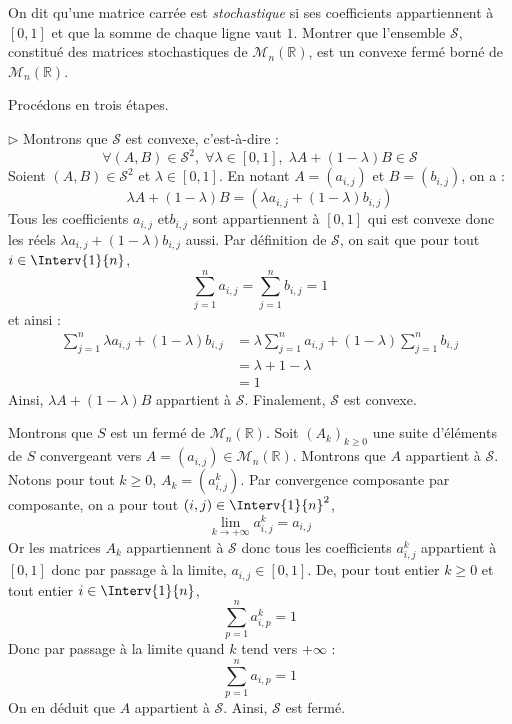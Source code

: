 \documentclass[a4paper,10pt]{report}
\begin{document}
\begin{Exercice}{} On dit qu'une matrice carrée est \textit{stochastique} si ses coefficients appartiennent à $[0,1]$ et que la somme de chaque ligne vaut $1$. Montrer que l'ensemble $\mathcal{S}$, constitué des matrices stochastiques de $\mathcal{M}_n(\mathbb{R})$, est un convexe fermé borné de $\mathcal{M}_n(\mathbb{R})$.
\end{Exercice} 

\corr Procédons en trois étapes.

\medskip

\noindent $\rhd$ Montrons que $\mathcal{S}$ est convexe, c'est-à-dire :
$$ \forall (A,B) \in \mathcal{S}^2, \; \forall \lambda \in [0,1], \; \lambda A+(1-\lambda)B \in \mathcal{S}$$
Soient $(A,B) \in \mathcal{S}^2$ et $\lambda \in [0,1]$. En notant $A=(a_{i,j})$ et $B=(b_{i,j})$, on a :
$$ \lambda A+ (1- \lambda) B = (\lambda a_{i,j} + (1- \lambda) b_{i,j})$$
Tous les coefficients $a_{i,j}$ et$ b_{i,j}$ sont appartiennent à $[0,1]$ qui est convexe donc les réels $\lambda a_{i,j} + (1- \lambda) b_{i,j}$ aussi. Par définition de $\mathcal{S}$, on sait que pour tout $i \in \Interv{1}{n}$,
$$ \sum_{j=1}^n a_{i,j} = \sum_{j=1}^n b_{i,j} = 1$$
et ainsi :
\begin{align*}
\sum_{j=1}^n \lambda a_{i,j} + (1 - \lambda) b_{i,j} & = \lambda   \sum_{j=1}^n a_{i,j} + (1 - \lambda)  \sum_{j=1}^n b_{i,j}  \\
& = \lambda + 1- \lambda \\
& = 1
\end{align*}
Ainsi, $\lambda A+ (1- \lambda)B$ appartient à $\mathcal{S}$. Finalement, $\mathcal{S}$ est convexe.

\medskip

\noindent Montrons que $S$ est un fermé de $\mathcal{M}_n(\mathbb{R})$. Soit $(A_k)_{k \geq 0}$ une suite d'éléments de $S$ convergeant vers $A=(a_{i,j}) \in \mathcal{M}_n(\mathbb{R})$. Montrons que $A$ appartient à $\mathcal{S}$. Notons pour tout $k \geq 0$, $A_k = (a_{i,j}^k)$. Par convergence composante par composante, on a pour tout $(i,j) \in \Interv{1}{n}^2$,
$$ \lim_{k \rightarrow + \infty} a_{i,j}^k = a_{i,j}$$
Or les matrices $A_k$ appartiennent à $\mathcal{S}$ donc tous les coefficients $a_{i,j}^k$ appartient à $[0,1]$ donc par passage à la limite, $a_{i,j} \in [0,1]$. De, pour tout entier $k \geq 0$ et tout entier $i \in \Interv{1}{n}$,
$$ \sum_{p=1}^n a_{i,p}^k = 1$$
Donc par passage à la limite quand $k$ tend vers $+ \infty$ :
$$ \sum_{p=1}^n a_{i,p} = 1$$
On en déduit que $A$ appartient à $\mathcal{S}$. Ainsi, $\mathcal{S}$ est fermé.
\end{document}
